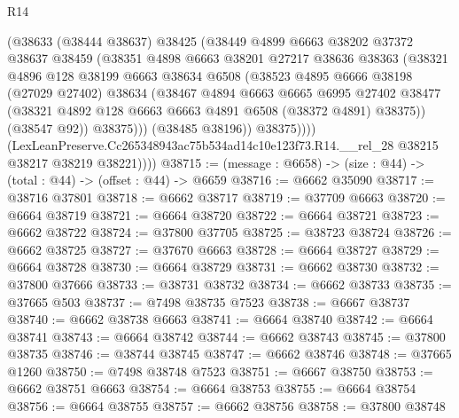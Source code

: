 \begin{lexlean}{R14}
\begin{coremodule}
                  (@38633
                    (@38444 @38637)
                    @38425
                    (@38449
                      @4899
                      @6663
                      @38202
                      @37372
                      @38637
                      @38459
                      (@38351
                        @4898
                        @6663
                        @38201
                        @27217
                        @38636
                        @38363
                        (@38321
                          @4896
                          @128
                          @38199
                          @6663
                          @38634
                          @6508
                          (@38523
                            @4895
                            @6666
                            @38198
                            (@27029 @27402)
                            @38634
                            (@38467
                              @4894
                              @6663
                              @6665
                              @6995
                              @27402
                              @38477
                              (@38321 @4892 @128 @6663 @6663 @4891 @6508 (@38372 @4891) @38375))
                            (@38547 @92))
                          @38375)))
                    (@38485 @38196))
                  @38375))))
          (LexLeanPreserve.Cc265348943ac75b534ad14c10e123f73.R14.__rel_28
            @38215
            @38217
            @38219
            @38221))))
@38715 := (message : @6658) -> (size : @44) -> (total : @44) -> (offset : @44) -> @6659
@38716 := @6662 @35090
@38717 := @38716 @37801
@38718 := @6662 @38717
@38719 := @37709 @6663
@38720 := @6664 @38719
@38721 := @6664 @38720
@38722 := @6664 @38721
@38723 := @6662 @38722
@38724 := @37800 @37705
@38725 := @38723 @38724
@38726 := @6662 @38725
@38727 := @37670 @6663
@38728 := @6664 @38727
@38729 := @6664 @38728
@38730 := @6664 @38729
@38731 := @6662 @38730
@38732 := @37800 @37666
@38733 := @38731 @38732
@38734 := @6662 @38733
@38735 := @37665 @503
@38737 := @7498 @38735 @7523
@38738 := @6667 @38737
@38740 := @6662 @38738 @6663
@38741 := @6664 @38740
@38742 := @6664 @38741
@38743 := @6664 @38742
@38744 := @6662 @38743
@38745 := @37800 @38735
@38746 := @38744 @38745
@38747 := @6662 @38746
@38748 := @37665 @1260
@38750 := @7498 @38748 @7523
@38751 := @6667 @38750
@38753 := @6662 @38751 @6663
@38754 := @6664 @38753
@38755 := @6664 @38754
@38756 := @6664 @38755
@38757 := @6662 @38756
@38758 := @37800 @38748

\end{coremodule}
\end{lexlean}
